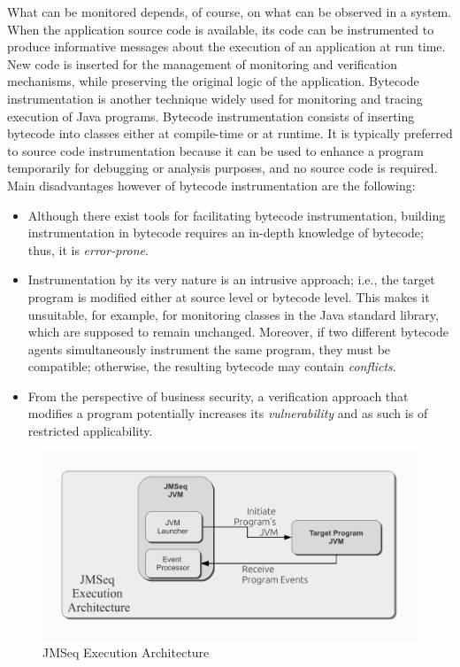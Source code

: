 What can be monitored depends, of course, on what can be observed in a system.
When the application source code is available, its code can be instrumented 
to produce informative messages about the execution of an application at run
time. New code is inserted  for the management of
monitoring and verification mechanisms, while preserving the original logic
of the application. 
Bytecode instrumentation is another technique widely used 
for monitoring and tracing execution of Java programs.
Bytecode instrumentation consists of inserting bytecode into classes either at compile-time or at runtime. 
It is typically preferred to source code instrumentation because it can be used to
enhance a program temporarily for debugging or
analysis purposes, and no source code is required.
Main disadvantages however of  bytecode
instrumentation are the following:

\begin{itemize}
\item
Although there exist tools for facilitating bytecode
instrumentation, building instrumentation in bytecode
requires an in-depth knowledge of bytecode; thus, it is \emph{error-prone}.
\item
Instrumentation by  its very nature is an intrusive approach; i.e., the target program is modified either at source level or bytecode level.
This makes it unsuitable, for example, for monitoring classes in the Java standard library, which are supposed to remain unchanged.
Moreover, if two different bytecode agents simultaneously instrument the same program,
they must be compatible; otherwise, the resulting bytecode may contain \emph{conflicts}.
\item
      From the perspective of business security, a verification approach that modifies a program potentially increases its \emph{vulnerability } and as such is of restricted applicability.
\end{itemize}

\begin{figure}[t]
\begin{center}
\includegraphics[scale=0.5]{images/arch-diagram-summary-exec}
\caption{JMSeq Execution Architecture}
\label{fig:arch-overview}
\end{center}
\end{figure}

